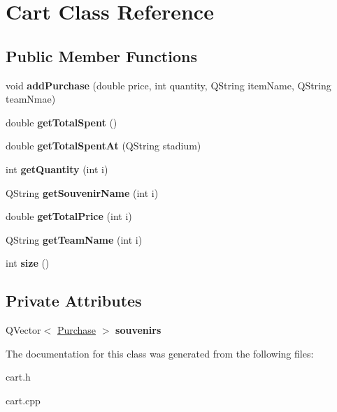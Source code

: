 \hypertarget{class_cart}{}\section{Cart Class Reference}
\label{class_cart}
\subsection*{Public Member Functions}
\begin{DoxyCompactItemize}
\item 
\mbox{\label{class_cart_a2260991ab57f2d95e17e977e4c183fdd}} 
void {\bfseries add\+Purchase} (double price, int quantity, Q\+String item\+Name, Q\+String team\+Nmae)
\item 
\mbox{\label{class_cart_a2299824d255f3110ad5eda5bfbd1b3ac}} 
double {\bfseries get\+Total\+Spent} ()
\item 
\mbox{\label{class_cart_a45873b2f5d9913f9de39599d8ab25a12}} 
double {\bfseries get\+Total\+Spent\+At} (Q\+String stadium)
\item 
\mbox{\label{class_cart_abced3b2b64a6800abb3e37b62496d2e5}} 
int {\bfseries get\+Quantity} (int i)
\item 
\mbox{\label{class_cart_ad4906647eb9e958121d301f4aa9eb215}} 
Q\+String {\bfseries get\+Souvenir\+Name} (int i)
\item 
\mbox{\label{class_cart_a2d0efd1dac0bcbe20c739dfdc2db8d05}} 
double {\bfseries get\+Total\+Price} (int i)
\item 
\mbox{\label{class_cart_ae084fb0f5de20ded9e938dc28676daea}} 
Q\+String {\bfseries get\+Team\+Name} (int i)
\item 
\mbox{\label{class_cart_ac89333c3766ab987cad13fc430407b78}} 
int {\bfseries size} ()
\end{DoxyCompactItemize}
\subsection*{Private Attributes}
\begin{DoxyCompactItemize}
\item 
\mbox{\label{class_cart_a546a0df14f71469925c0cf008667983c}} 
Q\+Vector$<$ \hyperlink{class_purchase}{Purchase} $>$ {\bfseries souvenirs}
\end{DoxyCompactItemize}


The documentation for this class was generated from the following files\+:\begin{DoxyCompactItemize}
\item 
cart.\+h\item 
cart.\+cpp\end{DoxyCompactItemize}

